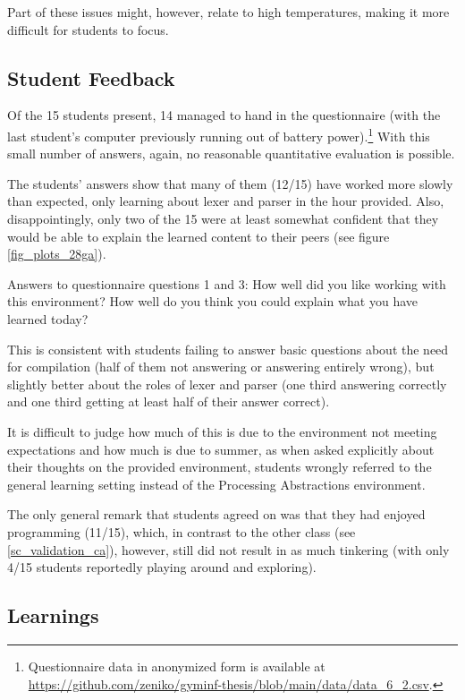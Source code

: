 Part of these issues might, however, relate to high temperatures, making it more difficult for students to focus.


\subsection{Student Feedback}

Of the 15 students present, 14 managed to hand in the questionnaire (with the last student's computer previously running out of battery power).\footnote{Questionnaire data in anonymized form is available at \url{https://github.com/zeniko/gyminf-thesis/blob/main/data/data_6_2.csv}.} With this small number of answers, again, no reasonable quantitative evaluation is possible.

The students' answers show that many of them (12/15) have worked more slowly than expected, only learning about lexer and parser in the hour provided. Also, disappointingly, only two of the 15 were at least somewhat confident that they would be able to explain the learned content to their peers (see figure \ref{fig_plots_28ga}).

\begin{cfigure}{Answers to questionnaire questions 1 and 3: How well did you like working with this environment? How well do you think you could explain what you have learned today?}

\end{cfigure}

This is consistent with students failing to answer basic questions about the need for compilation (half of them not answering or answering entirely wrong), but slightly better about the roles of lexer and parser (one third answering correctly and one third getting at least half of their answer correct).

It is difficult to judge how much of this is due to the environment not meeting expectations and how much is due to summer, as when asked explicitly about their thoughts on the provided environment, students wrongly referred to the general learning setting instead of the Processing Abstractions environment.

The only general remark that students agreed on was that they had enjoyed programming (11/15), which, in contrast to the other class (see \ref{sc_validation_ca}), however, still did not result in as much tinkering (with only 4/15 students reportedly playing around and exploring).


\subsection{Learnings}

